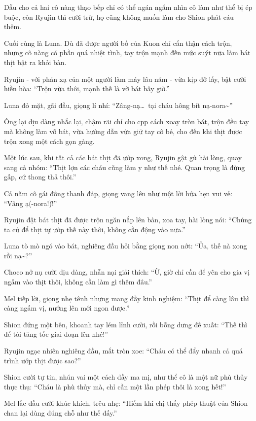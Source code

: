 \documentclass[../main.tex]{subfiles}
\begin{document}
Dẫu cho cả hai cô nàng thạo bếp chỉ có thể ngán ngẩm nhìn cô làm như thể bị ép buộc, còn Ryujin thì cười trừ, họ cũng không muốn làm cho Shion phát cáu thêm.

Cuối cùng là Luna. Dù đã được người bố của Kuon chỉ cẩn thận cách trộn, nhưng cô nàng có phần quá nhiệt tình, tay trộn mạnh đến mức suýt nữa làm bát thịt bật ra khỏi bàn.

Ryujin - với phản xạ của một người làm máy lâu năm - vừa kịp đỡ lấy, bật cười hiền hòa: ``Trộn vừa thôi, mạnh thế là vỡ bát bây giờ.''

Luna đỏ mặt, gãi đầu, giọng lí nhí: ``Zâng-nạ\dots\ tại cháu hông bít nạ-nora\~{}''

Ông lại dịu dàng nhắc lại, chậm rãi chỉ cho cpp cách xoay tròn bát, trộn đều tay mà không làm vỡ bát, vừa hướng dẫn vừa giữ tay cô bé, cho đến khi thịt được trộn xong một cách gọn gàng.

Một lúc sau, khi tất cả các bát thịt đã ướp xong, Ryujin gật gù hài lòng, quay sang cả nhóm: ``Thịt lợn các cháu cũng làm y như thế nhé. Quan trọng là đừng gấp, cứ thong thả thôi.''

Cả năm cô gái đồng thanh đáp, giọng vang lên như một lời hứa hẹn vui vẻ: ``Vâng ạ(-nora!)\~!''

\ct

Ryujin đặt bát thịt đã được trộn ngăn nắp lên bàn, xoa tay, hài lòng nói: ``Chúng ta cứ để thịt tự ướp thế này thôi, không cần động vào nữa.''

Luna tò mò ngó vào bát, nghiêng đầu hỏi bằng giọng non nớt: ``Ủa, thế nà xong rồi nạ\~{}?''

Choco nở nụ cười dịu dàng, nhẫn nại giải thích: ``Ừ, giờ chỉ cần để yên cho gia vị ngấm vào thịt thôi, không cần làm gì thêm đâu.''

Mel tiếp lời, giọng nhẹ tênh nhưng mang đầy kinh nghiệm: ``Thịt để càng lâu thì càng ngấm vị, nướng lên mới ngon được.''

Shion đứng một bên, khoanh tay lém lỉnh cười, rồi bỗng dưng đề xuất: ``Thế thì để tôi tăng tốc giai đoạn lên nhé!''

Ryujin ngạc nhiên nghiêng đầu, mắt tròn xoe: ``Cháu có thể đẩy nhanh cả quá trình ướp thịt được sao?''

Shion cười tự tin, nhún vai một cách đầy ma mị, như thể cô là một nữ phù thủy thực thụ: ``Cháu là phù thủy mà, chỉ cần một lần phép thôi là xong hết!''

Mel lắc đầu cười khúc khích, trêu nhẹ: ``Hiếm khi chị thấy phép thuật của Shion-chan lại dùng đúng chỗ như thế đấy.''
\end{document}
